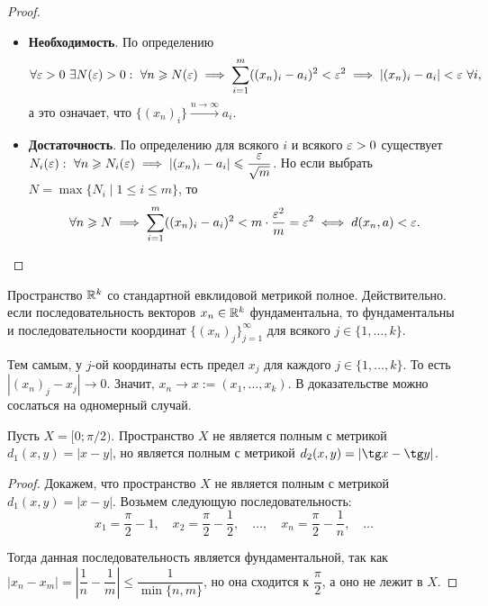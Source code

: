 \documentclass[a4paper]{article}
\theoremstyle{named}
\begin{document}
    \begin{proof}~

        \begin{itemize}
        \item \textbf{Необходимость}. 
            По определению
            \begin{equation*}
                \forall \eps > 0 \ \exists N(\eps) > 0: \ \forall n \geq N(\eps) \implies \sum_{i = 1}^m ((x_n)_i - a_i)^2 < \eps^2 \implies |(x_n)_i - a_i| < \eps \ \forall i,
            \end{equation*}
            а это означает, что $\{(x_n)_i\} \xrightarrow{n \to \infty} a_i$.

        \item \textbf{Достаточность}. 
            По определению для всякого $i$ и всякого $\varepsilon > 0$ существует $N_i(\varepsilon): \ \forall n \geqslant N_i(\varepsilon) \implies |(x_n)_i - a_i| \leqslant \dfrac{\varepsilon}{\sqrt{m}}$. Но если выбрать $N = \max \{N_i \mid 1 \leq i \leq m\}$, то
            \begin{equation*}
                \forall n \geqslant N \implies \sum_{i = 1}^m ((x_n)_i - a_i)^2 < m \cdot \dfrac{\varepsilon^2}{m} = \varepsilon^2 \iff d(x_n, a) < \varepsilon.
            \end{equation*}
        \end{itemize}
    \end{proof}

    \begin{example*}
        Пространство $\mathbb{R}^k$ со стандартной евклидовой метрикой полное. Действительно. если последовательность векторов $x_n \in \mathbb{R}^k$ фундаментальна, то фундаментальны и последовательности координат $\{(x_n)_j\}_{j = 1}^{\infty}$ для всякого $j \in \{1, \dots, k\}$.

        Тем самым, у $j$-ой координаты есть предел $x_j$ для каждого $j \in \{1, \dots, k\}$. То есть $|(x_n)_j - x_j| \to 0$. Значит, $x_n \to x := (x_1, \dots, x_k)$. В доказательстве можно сослаться на одномерный случай.
    \end{example*}

    \begin{example*}
        Пусть $X = [0; \pi / 2)$. Пространство $X$ не является полным с метрикой $d_1(x, y) = |x - y|$, но является полным с метрикой $d_2(x, y) = |\tg x - \tg y|$.
    \end{example*}

    \begin{proof}
        Докажем, что пространство $X$ не является полным с метрикой $d_1(x, y) = |x - y|$. Возьмем следующую последовательность:
        \begin{equation*}
            x_1 = \dfrac{\pi}{2} - 1, \quad x_2 = \dfrac{\pi}{2} - \dfrac{1}{2}, \quad \dots, \quad x_n = \dfrac{\pi}{2} - \dfrac{1}{n}, \quad \dots
        \end{equation*}

        Тогда данная последовательность является фундаментальной, так как $|x_n - x_m| = \left|\dfrac{1}{n} - \dfrac{1}{m}\right| \leq \dfrac{1}{\min\{n, m\}}$, но она сходится к $\dfrac{\pi}{2}$, а оно не лежит в $X$.
    \end{proof}
\end{document}
